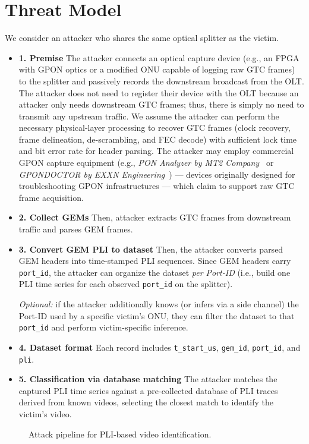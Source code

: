 \documentclass[sigconf]{acmart}
\begin{document}
\section{Threat Model}
We consider an attacker who shares the same optical splitter as the victim.
\begin{itemize}
  \item \textbf{1. Premise} The attacker connects an optical capture device (e.g., an FPGA with GPON optics
or a modified ONU capable of logging raw GTC frames) to the splitter and
passively records the downstream broadcast from the OLT. The attacker does not need to register their device with the OLT because an attacker only needs downstream GTC frames; thus, there is simply no need to transmit any upstream traffic.
We assume the attacker can perform the necessary physical-layer processing to recover GTC frames (clock recovery, frame delineation, de-scrambling, and FEC decode) with sufficient lock time and bit error rate for header parsing. The attacker may employ commercial GPON capture equipment
(e.g., \textit{PON Analyzer by MT2 Company~\cite{MT2}} or \textit{GPONDOCTOR by EXXN Engineering~\cite{EXXN}}) --- devices originally designed for troubleshooting GPON infrastructures --- which claim to support raw GTC frame acquisition.
  \item \textbf{2. Collect GEMs} Then, attacker extracts GTC frames from downstream traffic and parses GEM frames. 
  \item \textbf{3. Convert GEM PLI to dataset} Then, the attacker converts parsed GEM headers into time-stamped PLI sequences.
  Since GEM headers carry \texttt{port\_id}, the attacker can organize the dataset \emph{per Port-ID} (i.e., build one PLI time series for each observed \texttt{port\_id} on the splitter).

  \emph{Optional:} if the attacker additionally knows (or infers via a side channel) the Port-ID used by a specific victim's ONU, they can filter the dataset to that \texttt{port\_id} and perform victim-specific inference.
  \item \textbf{4. Dataset format} Each record includes \texttt{t\_start\_us}, \texttt{gem\_id}, \texttt{port\_id}, and \texttt{pli}.
  \item \textbf{5. Classification via database matching} The attacker matches the captured PLI time series against a pre-collected database of PLI traces derived from known videos, selecting the closest match to identify the victim's video.
\end{itemize}
\begin{figure}[!htbp]
  \centering
  
  \caption{Attack pipeline for PLI-based video identification.}
  \label{fig:pipeline}
\end{figure}
\end{document}
